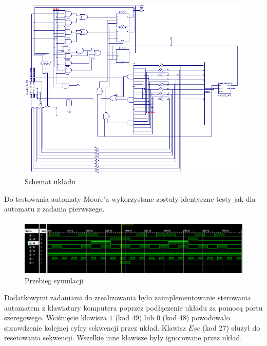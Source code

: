 \documentclass[wide,a4paper,titlepage,12pt] {article}
\begin{document}
  \begin{figure}[htbp]
    \begin{center}
      \includegraphics[scale=0.6]{moore-sch.png}
      \caption{Schemat układu}
     \end{center}
  \end{figure}

Do testowania automaty Moore'a wykorzystane zostały identyczne testy jak dla automatu z zadania pierwszego.

\paragraph{}

  \begin{figure}[htbp]
    \begin{center}
      \includegraphics[scale=0.5]{moore-sim.png}
      \caption{Przebieg symulacji}
     \end{center}
  \end{figure}

Dodatkowymi zadaniami do zrealizowania było zaimplementowanie sterowania automatem z klawiatury komputera poprzez podłączenie układu za pomocą portu szeregowego. Wciśnięcie klawisza $1$ (kod 49) lub $0$ (kod 48) powodowało sprawdzenie kolejnej cyfry sekwencji przez układ. Klawisz $Esc$ (kod 27) służył do resetowania sekwencji. Wszelkie inne klawisze były ignorowane przez układ.
\end{document}
